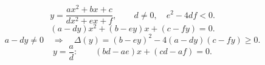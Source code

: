 \[
  y=\frac{ax^2+bx+c}{dx^2+ex+f},\qquad
  d\neq0,\quad e^2-4df<0.
\]
\[
  (a-dy)x^2+(b-ey)x+(c-fy)=0.
\]
\[
  a-dy\neq0\quad\Longrightarrow\quad
  \Delta(y)=(b-ey)^2-4(a-dy)(c-fy)\ge0.
\]
\[
  y=\frac ad:\qquad (bd-ae)x+(cd-af)=0.
\]
